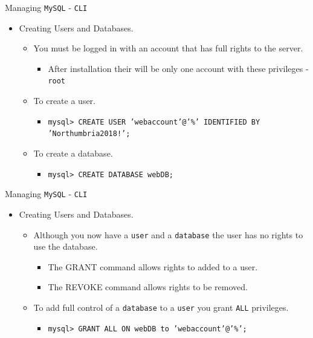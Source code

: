 \documentclass[xcolor=table]{beamer}
\begin{document}
\begin{frame}{Managing \texttt{MySQL} - \texttt{CLI}}
  \begin{itemize}
    \item Creating Users and Databases.
      \begin{itemize}
        \item You must be logged in with an account that has full rights to the server.
          \begin{itemize}
            \item After installation their will be only one account with these privileges - \texttt{root}
          \end{itemize}
        \item To create a user.
          \begin{itemize}
            \item \texttt{mysql> CREATE USER 'webaccount'@'\%' IDENTIFIED BY 'Northumbria2018!';}
          \end{itemize}
        \item To create a database.
          \begin{itemize}
            \item \texttt{mysql> CREATE DATABASE webDB;}
          \end{itemize}
      \end{itemize}
  \end{itemize}
\end{frame}

\begin{frame}{Managing \texttt{MySQL} - \texttt{CLI}}
  \begin{itemize}
    \item Creating Users and Databases.
      \begin{itemize}
        \item Although you now have a \texttt{user} and a \texttt{database} the user has no rights to use the database.
          \begin{itemize}
            \item The GRANT command allows rights to added to a user.
            \item The REVOKE command allows rights to be removed.
          \end{itemize}
        \item To add full control of a \texttt{database} to a \texttt{user} you grant \texttt{ALL} privileges.
          \begin{itemize}
            \item \texttt{mysql> GRANT ALL ON webDB to 'webaccount'@'\%';}
          \end{itemize}
      \end{itemize}
  \end{itemize}
\end{frame}
\end{document}
